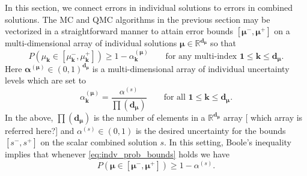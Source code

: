 \documentclass[graybox]{svmult}
\newcommand{\JRComment}[1]{{\color{violet}#1}}
\begin{document}
In this section, we connect errors in individual solutions to errors in combined solutions. The MC and QMC algorithms in the previous section may be vectorized in a straightforward manner to attain error bounds $[\boldsymbol{\mu}^-,\boldsymbol{\mu}^+]$ on a multi-dimensional array of individual solutions $\boldsymbol{\mu} \in \mathbb{R}^{\boldsymbol{d}_{\boldsymbol{\mu}}}$ so that 
\begin{equation}
    P(\mu_{\boldsymbol{k}} \in [\mu_{\boldsymbol{k}}^-,\mu_{\boldsymbol{k}}^+]) \geq 1-\alpha_{\boldsymbol{k}}^{(\boldsymbol{\mu})}  \qquad \text{for any multi-index }\boldsymbol{1} \leq \boldsymbol{k} \leq \boldsymbol{d}_{\boldsymbol{\mu}}.
    \label{eq:indv_prob_bounds}
\end{equation}
Here $\boldsymbol{\alpha}^{(\boldsymbol{\mu})} \in (0,1)^{\boldsymbol{d}_{\boldsymbol{\mu}}}$ is a multi-dimensional array of individual uncertainty levels which are set to 
\begin{equation}
    \alpha_{\boldsymbol{k}}^{(\boldsymbol{\mu})} = \frac{\alpha^{(s)}}{\prod(\boldsymbol{d}_{\boldsymbol{\mu}})}
    \label{eq:alpha_mu_from_alpha_s} \qquad \text{for all }\boldsymbol{1} \leq \boldsymbol{k} \leq \boldsymbol{d}_{\boldsymbol{\mu}}.
\end{equation}
In the above, $\prod(\boldsymbol{d}_{\boldsymbol{\mu}})$ is the number of elements in a $\mathbb{R}^{\boldsymbol{d}_{\boldsymbol{\mu}}}$ array [ \JRComment{which array is referred here?}] and $\alpha^{(s)} \in (0,1)$ is the desired uncertainty for the bounds $[s^-,s^+]$ on the scalar combined solution $s$. In this setting, Boole's inequality \cite{boole1847mathematical} implies that whenever \eqref{eq:indv_prob_bounds} holds we have
\begin{equation}
    P(\boldsymbol{\mu} \in [\boldsymbol{\mu}^-,\boldsymbol{\mu}^+]) \geq 1-\alpha^{(s)}.
    \label{eq:indv_prob_bounds_all}
\end{equation} 
\end{document}
